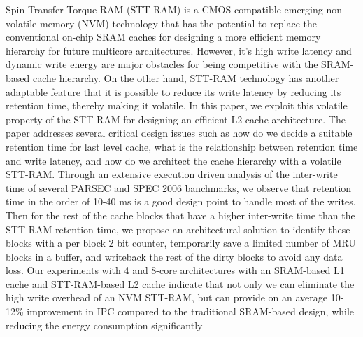 
Spin-Transfer Torque RAM (STT-RAM) is a CMOS compatible emerging non-volatile memory (NVM) 
technology that has the potential to replace the conventional
on-chip SRAM caches for designing a more efficient memory hierarchy for
future multicore architectures. 
However, it's high write latency and dynamic
write energy are major obstacles for being competitive with the SRAM-based cache hierarchy.
On the other hand, STT-RAM technology has another adaptable feature that it is possible to reduce its write
latency by reducing its retention time, thereby making it volatile.
In this paper, we exploit this volatile property of the STT-RAM for designing an efficient L2 cache 
architecture. The paper addresses several critical design issues such as how do we decide a suitable retention time for last level cache,
what is the relationship between retention time and write latency,
and how do we architect the cache hierarchy with a volatile STT-RAM.
Through an extensive execution driven analysis of the inter-write time of several PARSEC and SPEC 2006 banchmarks, we 
observe that retention time in the order of 10-40 ms is a good design point to handle most of the
writes.  Then for the rest of the cache blocks that have a higher inter-write
time than the STT-RAM retention time, we propose an architectural solution to identify these blocks
with a per block 2 bit counter, temporarily save a limited number of MRU blocks in a buffer,
and writeback the rest of the dirty blocks to avoid any data loss.
Our experiments with 4 and 8-core architectures with an SRAM-based L1 cache and STT-RAM-based L2 cache 
indicate that not only we can eliminate the high write overhead of an NVM STT-RAM, but can provide
on an average 10-12\% improvement in IPC compared to the traditional SRAM-based
design, while reducing the energy consumption significantly 

